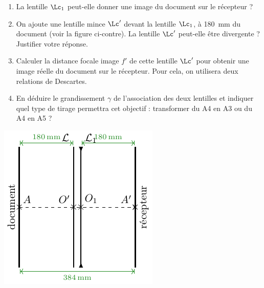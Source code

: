 \documentclass[../../main/main.tex]{subfiles}
\begin{document}
\begin{minipage}{0.55\linewidth}
	\begin{enumerate}
		\item La lentille $\Lc_1$ peut-elle donner une image du document sur le
		      récepteur ?
		\item On ajoute une lentille mince $\Lc'$ devant la lentille $\Lc_1$, à
		      \SI{180}{mm} du document (voir la figure ci-contre). La lentille
		      $\Lc'$ peut-elle être divergente ? Justifier votre réponse.
		\item Calculer la distance focale image $f'$ de cette lentille $\Lc'$
		      pour obtenir une image réelle du document sur le récepteur. Pour
		      cela, on utilisera deux relations de Descartes.
		\item En déduire le grandissement $\gamma$ de l'association des deux
		      lentilles et indiquer quel type de tirage permettra cet objectif :
		      transformer du A4 en A3 ou du A4 en A5 ?
	\end{enumerate}
\end{minipage}
\begin{minipage}{0.45\linewidth}
	\begin{center}
		\includegraphics[width=\linewidth]{photocopieur-b}
	\end{center}
\end{minipage}
\end{document}
